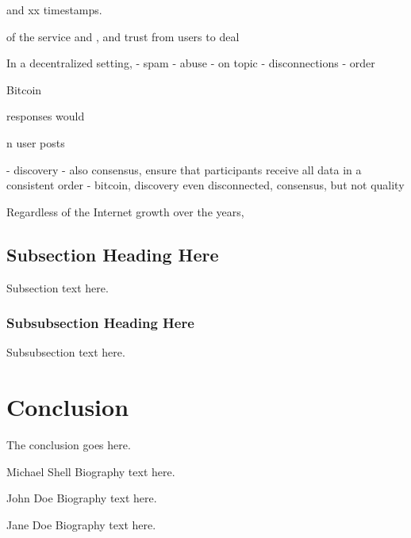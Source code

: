 \documentclass[10pt,journal,compsoc]{IEEEtran}
\begin{document}
 and xx timestamps.


 of the service and , and trust from users to deal

In a decentralized setting, 
    - spam
    - abuse
    - on topic
    - disconnections
    - order

Bitcoin

responses would




n user posts 

- discovery
- also consensus, ensure that participants receive all data in a consistent order
- bitcoin, discovery even disconnected, consensus, but not quality


Regardless of the Internet growth over the years,

\subsection{Subsection Heading Here}
Subsection text here.

\subsubsection{Subsubsection Heading Here}
Subsubsection text here.

\section{Conclusion}
The conclusion goes here.




\begin{IEEEbiography}{Michael Shell}
Biography text here.
\end{IEEEbiography}

\begin{IEEEbiographynophoto}{John Doe}
Biography text here.
\end{IEEEbiographynophoto}

\begin{IEEEbiographynophoto}{Jane Doe}
Biography text here.
\end{IEEEbiographynophoto}
\end{document}
